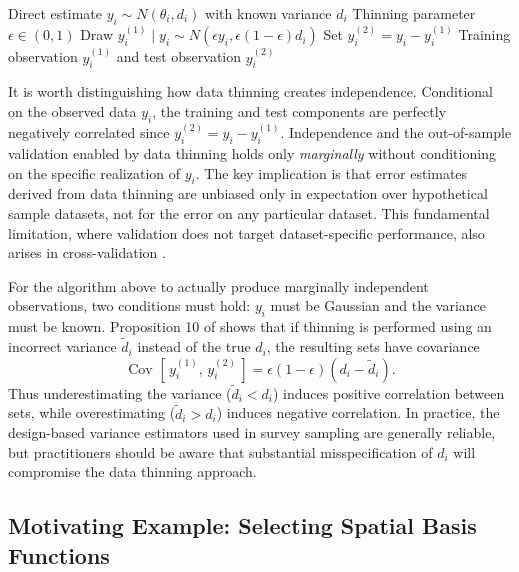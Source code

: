 \documentclass[11pt]{article}
\newcommand{\ytrain}{y^{(1)}}                           %
\newcommand{\ytest}{y^{(2)}}                            %
\newcommand{\Cov}[3][]{\operatorname{Cov}_{#1}\!\left[\,#2,\,#3\,\right]}
\newcommand{\N}[2]{N\!\left(#1, #2\right)}
\theoremstyle{plain}
\theoremstyle{definition}
\theoremstyle{remark}
\begin{document}
\begin{algorithm}[H]
\caption{Gaussian Data Thinning (Algorithm 1 of \citet{neufeld_data_2024})}\label{alg:thin}
\begin{algorithmic}[1]
\Require Direct estimate $y_i \sim \N{\theta_i}{d_i}$ with known variance $d_i$
\Require Thinning parameter $\epsilon \in (0, 1)$
\State Draw $\ytrain_i \mid y_i \sim \N{\epsilon y_i}{\epsilon(1-\epsilon)d_i}$
\State Set $\ytest_i = y_i - \ytrain_i$
\State \Return Training observation $\ytrain_i$ and test observation $\ytest_i$
\end{algorithmic}
\end{algorithm}

It is worth distinguishing how data thinning creates independence. Conditional on the observed data $y_i$, the training and test components are perfectly negatively correlated since $\ytest_i = y_i - \ytrain_i$. Independence and the out-of-sample validation enabled by data thinning holds only \emph{marginally} without conditioning on the specific realization of $y_i$. The key implication is that error estimates derived from data thinning are unbiased only in expectation over hypothetical sample datasets, not for the error on any particular dataset. This fundamental limitation, where validation does not target dataset-specific performance, also arises in cross-validation  \citep{bates_cross-validation_2024}.

For the algorithm above to actually produce marginally independent observations, two conditions must hold: $y_i$ must be Gaussian and the variance must be known. Proposition 10 of \citet{neufeld_data_2024} shows that if thinning is performed using an incorrect variance $\tilde{d}_i$ instead of the true $d_i$, the resulting sets have covariance
\[
\Cov{\ytrain_i}{\ytest_i} = \epsilon(1-\epsilon)(d_i - \tilde{d}_i).
\]
Thus underestimating the variance ($\tilde{d}_i < d_i$) induces positive correlation between sets, while overestimating ($\tilde{d}_i > d_i$) induces negative correlation. In practice, the design-based variance estimators used in survey sampling are generally reliable, but practitioners should be aware that substantial misspecification of $d_i$ will compromise the data thinning approach.

\subsection{Motivating Example: Selecting Spatial Basis Functions} \label{sec:motivating_ex}
\end{document}
